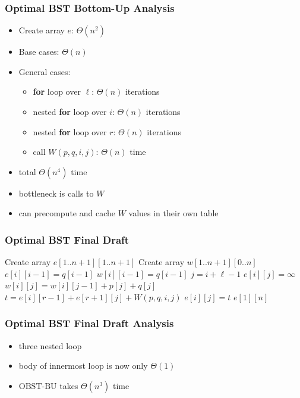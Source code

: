 \documentclass{beamer}
\begin{document}
\begin{frame} \frametitle{Optimal BST Bottom-Up Analysis}
  \begin{itemize}
    \item Create array $e$: $\Theta(n^2)$
    \item Base cases: $\Theta(n)$
    \item General cases:
      \begin{itemize}
        \item \textbf{for} loop over $\ell$: $\Theta(n)$ iterations
        \item nested \textbf{for} loop over $i$: $\Theta(n)$ iterations
        \item nested \textbf{for} loop over $r$: $\Theta(n)$ iterations
        \item call $W(p, q, i, j)$: $\Theta(n)$ time
      \end{itemize}
    \item total $\Theta(n^4)$ time
    \item bottleneck is calls to $W$
    \item can precompute and cache $W$ values in their own table
  \end{itemize}
\end{frame}

\begin{frame} \frametitle{Optimal BST Final Draft}
  {\tiny
  \begin{algorithmic}[1]
    \State Create array $e[1..n+1][1..n+1]$ 
    \State Create array $w[1..n+1][0..n]$ 
      \State $e[i][i-1] = q[i-1]$ 
      \State $w[i][i-1] = q[i-1]$
    \EndFor
        \State $j = i + \ell - 1$
        \State $e[i][j] = \infty$
        \State $w[i][j] = w[i][j-1] + p[j] + q[j]$
          \State $t = e[i][r-1] + e[r+1][j] + W(p, q, i, j)$
            \State $e[i][j] = t$
          \EndIf
        \EndFor
      \EndFor
    \EndFor
    \State \Return $e[1][n]$
    \EndFunction
  \end{algorithmic}
  }
\end{frame}

\begin{frame} \frametitle{Optimal BST Final Draft Analysis}
  \begin{itemize}
    \item three nested loop
    \item body of innermost loop is now only $\Theta(1)$
    \item $\text{OBST-BU}$ takes $\Theta(n^3)$ time
  \end{itemize}
\end{frame}
\end{document}

